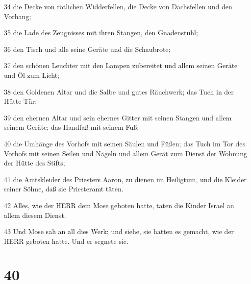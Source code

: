 \par 34 die Decke von rötlichen Widderfellen, die Decke von Dachsfellen und den Vorhang;
\par 35 die Lade des Zeugnisses mit ihren Stangen, den Gnadenstuhl;
\par 36 den Tisch und alle seine Geräte und die Schaubrote;
\par 37 den schönen Leuchter mit den Lampen zubereitet und allem seinen Geräte und Öl zum Licht;
\par 38 den Goldenen Altar und die Salbe und gutes Räuchwerk; das Tuch in der Hütte Tür;
\par 39 den ehernen Altar und sein ehernes Gitter mit seinen Stangen und allem seinem Geräte; das Handfaß mit seinem Fuß;
\par 40 die Umhänge des Vorhofs mit seinen Säulen und Füßen; das Tuch im Tor des Vorhofs mit seinen Seilen und Nägeln und allem Gerät zum Dienst der Wohnung der Hütte des Stifts;
\par 41 die Amtskleider des Priesters Aaron, zu dienen im Heiligtum, und die Kleider seiner Söhne, daß sie Priesteramt täten.
\par 42 Alles, wie der HERR dem Mose geboten hatte, taten die Kinder Israel an allem diesem Dienst.
\par 43 Und Mose sah an all dies Werk; und siehe, sie hatten es gemacht, wie der HERR geboten hatte. Und er segnete sie.

\chapter{40}


